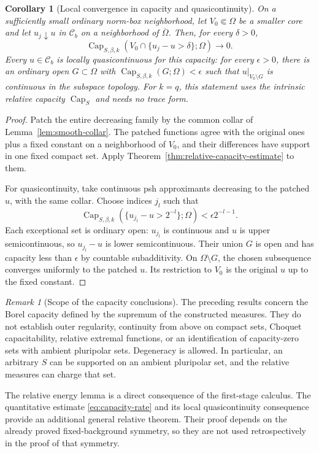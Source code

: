 \documentclass[11pt,a4paper]{article}
\numberwithin{equation}{section}
\newtheorem{corollary}[theorem]{Corollary}
\theoremstyle{definition}
\theoremstyle{remark}
\newtheorem{remark}[theorem]{Remark}
\newcommand{\Cb}{\mathcal C_b}
\begin{document}
\begin{corollary}[Local convergence in capacity and quasicontinuity]
\label{cor:relative-quasicontinuity}
On a sufficiently small ordinary norm-box neighborhood, let
$V_0\Subset\Omega$ be a smaller core and let $u_j\downarrow u$ in
$\Cb$ on a neighborhood of $\overline\Omega$. Then, for every
$\delta>0$,
\[
 \operatorname{Cap}_{S,\beta,k}
   (V_0\cap\{u_j-u>\delta\};\Omega)\longrightarrow0.
\]
Every $u\in\Cb$ is locally quasicontinuous for this capacity: for
every $\epsilon>0$, there is an ordinary open $G\subset\Omega$
with $\operatorname{Cap}_{S,\beta,k}(G;\Omega)<\epsilon$ such that
$u|_{V_0\setminus G}$ is continuous in the subspace topology.
For $k=q$, this statement uses the intrinsic relative capacity
$\operatorname{Cap}_S$ and needs no trace form.
\end{corollary}

\begin{proof}
Patch the entire decreasing family by the common collar of
Lemma~\ref{lem:smooth-collar}. The patched functions agree with the
original ones plus a fixed constant on a neighborhood of $V_0$,
and their differences have support in one fixed compact set. Apply
Theorem~\ref{thm:relative-capacity-estimate} to them.

For quasicontinuity, take continuous psh approximants decreasing to
the patched $u$, with the same collar. Choose indices $j_l$ such that
\[
 \operatorname{Cap}_{S,\beta,k}
       (\{u_{j_l}-u>2^{-l}\};\Omega)
       <\epsilon 2^{-l-1}.
\]
Each exceptional set is ordinary open: $u_{j_l}$ is continuous and
$u$ is upper semicontinuous, so $u_{j_l}-u$ is lower semicontinuous.
Their union $G$ is open and has capacity less than $\epsilon$ by
countable subadditivity. On $\Omega\setminus G$, the chosen
subsequence converges uniformly to the patched $u$. Its restriction
to $V_0$ is the original $u$ up to the fixed constant.
\end{proof}

\begin{remark}[Scope of the capacity conclusions]
The preceding results concern the Borel capacity defined by the
supremum of the constructed measures. They do not establish outer
regularity, continuity from above on compact sets, Choquet
capacitability, relative extremal functions, or an identification of
capacity-zero sets with ambient pluripolar sets. Degeneracy is allowed.
In particular, an arbitrary $S$ can be supported on an ambient
pluripolar set, and the relative measures can charge that set.

The relative energy lemma is a direct consequence of the first-stage
calculus. The quantitative estimate \eqref{eq:capacity-rate} and its
local quasicontinuity consequence provide an additional general
relative theorem. Their proof depends on the already proved
fixed-background symmetry, so they are not used retrospectively in
the proof of that symmetry.
\end{remark}
\end{document}
